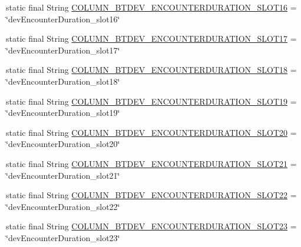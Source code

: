 \begin{DoxyCompactItemize}
\item 
static final String \hyperlink{classcs_1_1nsense_1_1db_1_1_n_sense_s_q_lite_helper_aa8de31531131eda77bf5db18f65c9e7b}{C\-O\-L\-U\-M\-N\-\_\-\-B\-T\-D\-E\-V\-\_\-\-E\-N\-C\-O\-U\-N\-T\-E\-R\-D\-U\-R\-A\-T\-I\-O\-N\-\_\-\-S\-L\-O\-T16} = \char`\"{}dev\-Encounter\-Duration\-\_\-slot16\char`\"{}
\item 
static final String \hyperlink{classcs_1_1nsense_1_1db_1_1_n_sense_s_q_lite_helper_ac55647f62ad55ab96661fabe27156787}{C\-O\-L\-U\-M\-N\-\_\-\-B\-T\-D\-E\-V\-\_\-\-E\-N\-C\-O\-U\-N\-T\-E\-R\-D\-U\-R\-A\-T\-I\-O\-N\-\_\-\-S\-L\-O\-T17} = \char`\"{}dev\-Encounter\-Duration\-\_\-slot17\char`\"{}
\item 
static final String \hyperlink{classcs_1_1nsense_1_1db_1_1_n_sense_s_q_lite_helper_af0b40f941b35daa7a86daf53697994db}{C\-O\-L\-U\-M\-N\-\_\-\-B\-T\-D\-E\-V\-\_\-\-E\-N\-C\-O\-U\-N\-T\-E\-R\-D\-U\-R\-A\-T\-I\-O\-N\-\_\-\-S\-L\-O\-T18} = \char`\"{}dev\-Encounter\-Duration\-\_\-slot18\char`\"{}
\item 
static final String \hyperlink{classcs_1_1nsense_1_1db_1_1_n_sense_s_q_lite_helper_a3af10883de8b80b461d36dae12812b70}{C\-O\-L\-U\-M\-N\-\_\-\-B\-T\-D\-E\-V\-\_\-\-E\-N\-C\-O\-U\-N\-T\-E\-R\-D\-U\-R\-A\-T\-I\-O\-N\-\_\-\-S\-L\-O\-T19} = \char`\"{}dev\-Encounter\-Duration\-\_\-slot19\char`\"{}
\item 
static final String \hyperlink{classcs_1_1nsense_1_1db_1_1_n_sense_s_q_lite_helper_af0783690cdda0a868a44c913c2bc4ccd}{C\-O\-L\-U\-M\-N\-\_\-\-B\-T\-D\-E\-V\-\_\-\-E\-N\-C\-O\-U\-N\-T\-E\-R\-D\-U\-R\-A\-T\-I\-O\-N\-\_\-\-S\-L\-O\-T20} = \char`\"{}dev\-Encounter\-Duration\-\_\-slot20\char`\"{}
\item 
static final String \hyperlink{classcs_1_1nsense_1_1db_1_1_n_sense_s_q_lite_helper_aeeb83cf96db1205867782917cb28fae3}{C\-O\-L\-U\-M\-N\-\_\-\-B\-T\-D\-E\-V\-\_\-\-E\-N\-C\-O\-U\-N\-T\-E\-R\-D\-U\-R\-A\-T\-I\-O\-N\-\_\-\-S\-L\-O\-T21} = \char`\"{}dev\-Encounter\-Duration\-\_\-slot21\char`\"{}
\item 
static final String \hyperlink{classcs_1_1nsense_1_1db_1_1_n_sense_s_q_lite_helper_a0465b5a08fa1199b51f892c714de80a8}{C\-O\-L\-U\-M\-N\-\_\-\-B\-T\-D\-E\-V\-\_\-\-E\-N\-C\-O\-U\-N\-T\-E\-R\-D\-U\-R\-A\-T\-I\-O\-N\-\_\-\-S\-L\-O\-T22} = \char`\"{}dev\-Encounter\-Duration\-\_\-slot22\char`\"{}
\item 
static final String \hyperlink{classcs_1_1nsense_1_1db_1_1_n_sense_s_q_lite_helper_aa19cb38e6c45606cd6e7a28c8938c7d6}{C\-O\-L\-U\-M\-N\-\_\-\-B\-T\-D\-E\-V\-\_\-\-E\-N\-C\-O\-U\-N\-T\-E\-R\-D\-U\-R\-A\-T\-I\-O\-N\-\_\-\-S\-L\-O\-T23} = \char`\"{}dev\-Encounter\-Duration\-\_\-slot23\char`\"{}

\end{DoxyCompactItemize}

